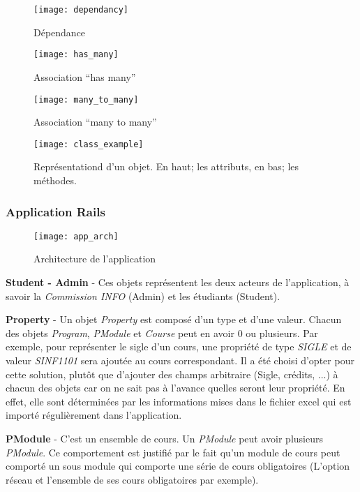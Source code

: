 \begin{figure}[H]
\centering
\caption{Dépendance}
\label{fig:dependancy}
\texttt{[image: dependancy]}
\end{figure}

\begin{figure}[H]
\centering
\caption{Association ``has many''}
\label{fig:has_many}
\texttt{[image: has\_many]}
\end{figure}

\begin{figure}[H]
\centering
\caption{Association ``many to many''}
\label{fig:many_to_many}
\texttt{[image: many\_to\_many]}
\end{figure}

\begin{figure}[H]
\centering
\caption{Représentationd d'un objet. En haut; les attributs, en bas; les méthodes.}
\label{fig:class_example}
\texttt{[image: class\_example]}
\end{figure}



\subsubsection{Application Rails}
\label{arch}
\begin{figure}[H]
\centering
\caption{Architecture de l'application}
\label{fig:app_arch}
\texttt{[image: app\_arch]}
\end{figure}

\textbf{Student - Admin} - Ces objets représentent les deux acteurs de l'application, à savoir la \textit{Commission INFO} (Admin) et les étudiants (Student).

\textbf{Property} - Un objet \textit{Property} est composé d'un type et d'une valeur. Chacun des objets \textit{Program}, \textit{PModule} et \textit{Course} peut en avoir 0 ou plusieurs. Par exemple, pour représenter le sigle d'un cours, une propriété de type \textit{SIGLE} et de valeur \textit{SINF1101} sera ajoutée au cours correspondant. Il a été choisi d'opter pour cette solution, plutôt que d'ajouter des champs arbitraire (Sigle, crédits, ...) à chacun des objets car on ne sait pas à l'avance quelles seront leur propriété. En effet, elle sont déterminées par les informations mises dans le fichier excel qui est importé régulièrement dans l'application. 

\textbf{PModule} - C'est un ensemble de cours. Un \textit{PModule} peut avoir plusieurs \textit{PModule}. Ce comportement est justifié par le fait qu'un module de cours peut comporté un sous module qui comporte une série de cours obligatoires (L'option réseau et l'ensemble de ses cours obligatoires par exemple).

